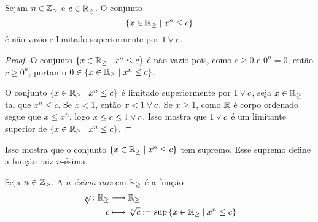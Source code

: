\begin{proposition}
Sejam $n \in \mathbb{Z}_{>}$ e $c \in \mathbb{R}_{\geq}$. O conjunto
	\begin{equation*}
	\left\{{x \in \mathbb{R}_{\geq}}\;\middle\vert\;{x^n \leq c}\right\}
	\end{equation*}
é não vazio e limitado superiormente por $1 \mathbin{\vee} c$.
\end{proposition}
\begin{proof}
O conjunto $\left\{{x \in \mathbb{R}_{\geq}}\;\middle\vert\;{x^n \leq c}\right\}$ é não vazio pois, como $c \geq 0$ e $0^n=0$, então $c \geq 0^n$, portanto $0 \in \left\{{x \in \mathbb{R}_{\geq}}\;\middle\vert\;{x^n \leq c}\right\}$.

O conjunto $\left\{{x \in \mathbb{R}_{\geq}}\;\middle\vert\;{x^n \leq c}\right\}$ é limitado superiormente por $1 \mathbin{\vee} c$, seja $x \in \mathbb{R}_{\geq}$ tal que $x^n \leq c$. Se $x<1$, então $x < 1 \mathbin{\vee} c$. Se $x \geq 1$, como $\mathbb{R}$ é corpo ordenado segue que $x \leq x^n$, logo $x \leq c \leq 1 \mathbin{\vee} c$. Isso mostra que $1 \mathbin{\vee} c$ é um limitante superior de $\left\{{x \in \mathbb{R}_{\geq}}\;\middle\vert\;{x^n \leq c}\right\}$.
\end{proof}

Isso mostra que o conjunto $\left\{{x \in \mathbb{R}_{\geq}}\;\middle\vert\;{x^n \leq c}\right\}$ tem supremo. Esse supremo define a função raiz $n$-ésima.

\begin{definition}
Seja $n \in \mathbb{Z}_{>}$. A \emph{$n$-ésima raiz} em $\mathbb{R}_{\geq}$ é a função
	\begin{align*}
	{\sqrt[n]{}}\colon {\mathbb{R}_{\geq}} &\longrightarrow {\mathbb{R}_{\geq}} \\{c} &\longmapsto \sqrt[n]{c} := \sup \left\{{x \in \mathbb{R}_{\geq}}\;\middle\vert\;{x^n \leq c}\right\}
	\end{align*}
\end{definition}


